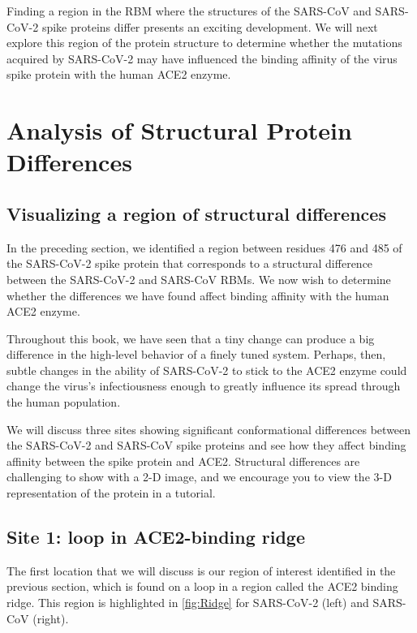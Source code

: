 Finding a region in the RBM where the structures of the SARS-CoV and SARS-CoV-2 spike proteins differ presents an exciting development. We will next explore this region of the protein structure to determine whether the mutations acquired by SARS-CoV-2 may have influenced the binding affinity of the virus spike protein with the human ACE2 enzyme.\\

\FloatBarrier
{}

\section{Analysis of Structural Protein Differences}
\label{sec:structural_differences}
\subsection{Visualizing a region of structural differences}

In the preceding section, we identified a region between residues 476 and 485 of the SARS-CoV-2 spike protein that corresponds to a structural difference between the SARS-CoV-2 and SARS-CoV RBMs. We now wish to determine whether the differences we have found affect binding affinity with the human ACE2 enzyme.

Throughout this book, we have seen that a tiny change can produce a big difference in the high-level behavior of a finely tuned system. Perhaps, then, subtle changes in the ability of SARS-CoV-2 to stick to the ACE2 enzyme could change the virus's infectiousness enough to greatly influence its spread through the human population.

We will discuss three sites showing significant conformational differences between the SARS-CoV-2 and SARS-CoV spike proteins and see how they affect binding affinity between the spike protein and ACE2. Structural differences are challenging to show with a 2-D image, and we encourage you to view the 3-D representation of the protein in a tutorial.\\

\FloatBarrier
{}
\subsection{Site 1: loop in ACE2-binding ridge}

The first location that we will discuss is our region of interest identified in the previous section, which is found on a loop in a region called the ACE2 binding ridge. This region is highlighted in \autoref{fig:Ridge} for SARS-CoV-2 (left) and SARS-CoV (right).\\

